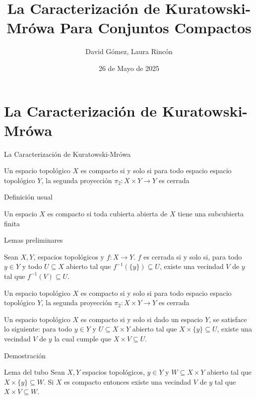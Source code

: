 \documentclass[10pt]{beamer}
\title{La Caracterización de Kuratowski-Mrówa Para Conjuntos Compactos}
\author[David G., Laura R.]{David Gómez, Laura Rincón}
\date[26/05/2025]{26 de Mayo de 2025}
\begin{document}
  \begin{frame}
    \titlepage
  \end{frame}

  \section{La Caracterización de Kuratowski-Mrówa}
  \begin{frame}{La Caracterización de Kuratowski-Mrówa}
      \begin{definition}
      Un espacio topológico $X$ es compacto si y solo si para todo espacio
      espacio topológico $Y$, la segunda proyección $\pi_2: X\times Y \longrightarrow Y$
      es cerrada 
    \end{definition}
  \end{frame}
  \begin{frame}{Definición usual}
    \begin{theorem}
      Un espacio $X$ es compacto si toda cubierta abierta de $X$
      tiene una subcubierta finita
    \end{theorem}
  \end{frame}

  \begin{frame}{Lemas preliminares}
    \begin{lemma}
        Sean $X,Y$, espacios topológicos y $f:X\longrightarrow Y$.
        $f$ es cerrada si y solo si, para todo $y\in Y$ y todo $U\subseteq X$ abierto
        tal que $f^{-1}(\{y\})\subseteq U$, existe una vecindad $V$ de $y$
        tal que $f^{-1}(V)\subseteq U$.
      \end{lemma}
      \begin{definition}
      Un espacio topológico $X$ es compacto si y solo si para todo espacio
      espacio topológico $Y$, la segunda proyección $\pi_2: X\times Y \longrightarrow Y$
      es cerrada 
    \end{definition}
    \begin{theorem}
  Un espacio topológico $X$ es compacto si y solo si
  dado un espacio $Y$, se satisface lo siguiente: para todo $y\in Y$ y
  $U\subseteq X\times Y$ abierto tal que $X\times \{y\}\subseteq U$, existe una vecindad
  $V$ de $y$ la cual cumple que $X \times V\subseteq U$.
\end{theorem}
\end{frame}
\begin{frame}{Demostración} 
      \begin{lemma}{Lema del tubo}
      Sean $X,Y$ espacios topológicos, $y\in Y$ y $W\subseteq X\times Y$ abierto tal que
  $X\times\{y\}\subseteq W$. Si $X$ es compacto entonces existe una vecindad $V$ de $y$ tal
  que $X\times V\subseteq W$.
      \end{lemma}
  \end{frame}
\end{document}
